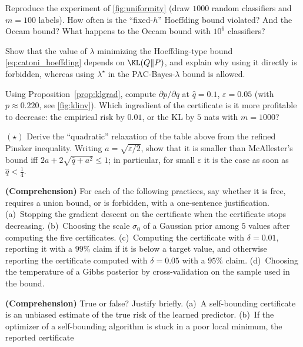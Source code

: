 \begin{exercises}
\begin{exercise}
Reproduce the experiment of \cref{fig:uniformity} (draw $1000$ random classifiers
and $m=100$ labels). How often is the ``fixed-$h$'' Hoeffding bound violated?
And the Occam bound? What happens to the Occam bound with $10^6$ classifiers?
\end{exercise}
\begin{exercise}
Show that the value of $\lambda$ minimizing the Hoeffding-type bound
\eqref{eq:catoni_hoeffding} depends on $\KL(Q\|P)$, and explain why using it
directly is forbidden, whereas using $\lambda^\star$ in the PAC-Bayes-$\lambda$ bound is allowed.
\end{exercise}
\begin{exercise}
Using Proposition~\ref{prop:klgrad}, compute $\partial p/\partial q$ at
$\hat q=0.1$, $\varepsilon=0.05$ (with $p\approx0.220$, see \cref{fig:klinv}). Which ingredient of
the certificate is it more profitable to decrease: the empirical risk by $0.01$,
or the KL by $5$ nats with $m=1000$?
\end{exercise}
\begin{exercise}
$(\star)$ Derive the ``quadratic'' relaxation of the table above from the refined
Pinsker inequality. Writing $a=\sqrt{\varepsilon/2}$, show that it is smaller than
McAllester's bound iff $2a+2\sqrt{\hat q+a^2}\leq1$; in particular, for small
$\varepsilon$ it is the case as soon as $\hat q<\frac14$.
\end{exercise}
\begin{exercise}
\textbf{(Comprehension)} For each of the following practices, say whether it is free,
requires a union bound, or is forbidden, with a one-sentence justification. (a)~Stopping
the gradient descent on the certificate when the certificate stops decreasing.
(b)~Choosing the scale $\sigma_0$ of a Gaussian prior among $5$ values after computing the
five certificates. (c)~Computing the certificate with $\delta=0.01$, reporting it with a $99\%$ claim if it is below a target value, and otherwise reporting the certificate computed with $\delta=0.05$ with a $95\%$ claim. (d)~Choosing the temperature of a
Gibbs posterior by cross-validation on the sample used in the bound.
\end{exercise}
\begin{exercise}
\textbf{(Comprehension)} True or false? Justify briefly. (a)~A self-bounding certificate
is an unbiased estimate of the true risk of the learned predictor. (b)~If the optimizer
of a self-bounding algorithm is stuck in a poor local minimum, the reported certificate

\end{exercise}
\end{exercises}
